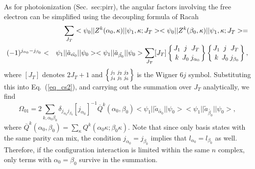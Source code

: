 As for photoionization (Sec.~{sec:pirr}), the angular factors involving the free
electron can be simplified using the decoupling formula of Racah
\begin{eqnarray}
&&\sum_{J_T}<\psi_0||Z^k(\alpha_0, \kappa)||\psi_1,\kappa;J_T>
<\psi_0||Z^k(\beta_0, \kappa)||\psi_1,\kappa;J_T> = \nonumber\\*
&(-1)^{j_{\alpha_0}-j_{\beta_0}}<&\psi_1||\tilde{a}_{\tilde{\alpha_0}}||\psi_0>
<\psi_1||\tilde{a}_{\tilde{\beta_0}}||\psi_0>
\sum_{J_T}[J_T]\sixj{J_1}{j}{J_T}{k}{J_0}{j_{\alpha_0}}
\sixj{J_1}{j}{J_T}{k}{J_0}{j_{\beta_0}},
\end{eqnarray}
where $[J_T]$ denotes $2J_T+1$ and $\sixj{j_1}{j_2}{j_3}{j_4}{j_5}{j_6}$ is
the Wigner $6j$ symbol. 
Substituting this into Eq.~(\ref{eq_cs2}), and carrying
out the summation over $J_T$ analytically, we find
\begin{equation}
\label{eq_scs}
\Omega_{01} = 2\sum_{k,\alpha_0\beta_0}
\delta_{j_{\alpha_0}j_{\beta_0}}[j_{\alpha_0}]^{-1} 
\overline{Q}^k(\alpha_0,\beta_0)
<\psi_1||\tilde{a}_{\tilde{\alpha_0}}||\psi_0>
<\psi_1||\tilde{a}_{\tilde{\beta_0}}||\psi_0>,
\end{equation}
where $\overline{Q}^k(\alpha_0,\beta_0) = \sum_\kappa
Q^k(\alpha_0\kappa;\beta_0\kappa)$.
Note that since only basis states with the same parity can mix, the condition
$j_{\alpha_0}=j_{\beta_0}$ implies that $l_{\alpha_0} = l_{\beta_0}$ as
well. Therefore, if the configuration interaction is limited within the same
$n$ complex, only terms with $\alpha_0 = \beta_0$ survive in the summation. 


